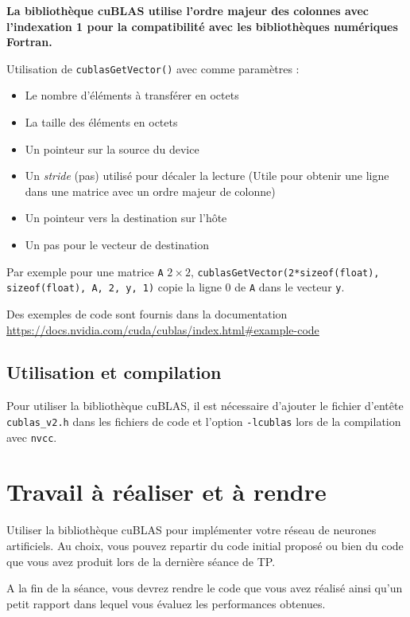 \documentclass[11pt]{paper}
\begin{document}
{\bf La bibliothèque cuBLAS utilise l'ordre majeur des colonnes avec l'indexation 1 pour la compatibilité avec les bibliothèques numériques Fortran.}

Utilisation de {\tt cublasGetVector()} avec comme paramètres :
\begin{itemize}
	\item Le nombre d'éléments à transférer en octets
	\item La taille des éléments en octets
	\item Un pointeur sur la source du device
	\item Un {\it stride} (pas) utilisé pour décaler la lecture (Utile pour obtenir une ligne dans une matrice avec un ordre majeur de colonne)
	\item Un pointeur vers la destination sur l'hôte
	\item Un pas pour le vecteur de destination
\end{itemize}
Par exemple pour une matrice {\tt A} $2 \times 2$, {\tt cublasGetVector(2*sizeof(float), sizeof(float), A, 2, y, 1)} copie la ligne 0 de {\tt A} dans le vecteur {\tt y}.

Des exemples de code sont fournis dans la documentation \href{https://docs.nvidia.com/cuda/cublas/index.html#example-code}{https://docs.nvidia.com/cuda/cublas/index.html\#example-code}

  \subsection{Utilisation et compilation}

Pour utiliser la bibliothèque cuBLAS, il est nécessaire d'ajouter le fichier d'entête {\tt cublas\_v2.h} dans les fichiers de code et l'option {\tt -lcublas} lors de la compilation avec {\tt nvcc}.

  \section{Travail à réaliser et à rendre}

Utiliser la bibliothèque cuBLAS pour implémenter votre réseau de neurones artificiels. Au choix, vous pouvez repartir du code initial proposé ou bien du code que vous avez produit lors de la dernière séance de TP.

A la fin de la séance, vous devrez rendre le code que vous avez réalisé ainsi qu'un petit rapport dans lequel vous évaluez les performances obtenues.
\end{document}

